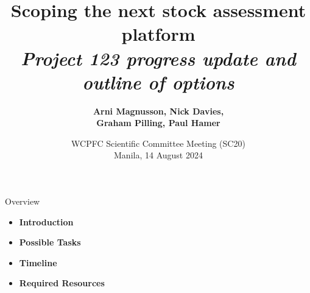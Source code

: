 \documentclass[aspectratio=169,fleqn]{beamer}
\begin{document}
\begin{frame}
  \title{\vspace{-5ex}\darkblue Scoping the next stock assessment
    platform\\[2ex]
    \it\large\darkgray
    Project 123 progress update and outline of options}
  \author{\vspace{-10ex}\darkgray\bf
    Arni Magnusson, Nick Davies,\\[0.5ex]
    Graham Pilling, Paul Hamer}
  \date{\darkgreen WCPFC Scientific Committee Meeting (SC20)\\[0.5ex]
    Manila, 14 August 2024}
  \titlepage
\end{frame}


\begin{frame}{Overview}
  \begin{itemize}
    \item[] {\bf\darkblue Introduction} \\[5ex]
    \item[] {\bf\darkblue Possible Tasks} \\[5ex]
    \item[] {\bf\darkblue Timeline} \\[5ex]
    \item[] {\bf\darkblue Required Resources} \\[1ex]
  \end{itemize}
\end{frame}

\end{document}
